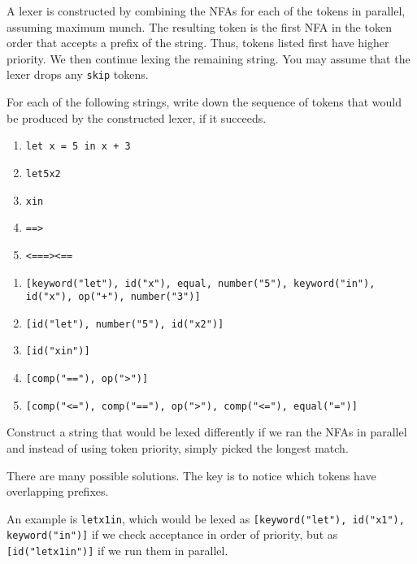 A lexer is constructed by combining the NFAs for each of the tokens in parallel,
assuming maximum munch. The resulting token is the first NFA in the token order
that accepts a prefix of the string. Thus, tokens listed first have higher
priority. We then continue lexing the remaining string. You may assume that the
lexer drops any \texttt{skip} tokens.

\begin{exercise}{}

  For each of the following strings, write down the sequence of tokens that
  would be produced by the constructed lexer, if it succeeds. 

  \begin{enumerate}
    \item \texttt{let x = 5 in x + 3}
    \item \texttt{let5x2}
    \item \texttt{xin}
    \item \texttt{==>}
    \item \texttt{<===><==}
  \end{enumerate}

  \begin{solution}
    \begin{enumerate}
      \item \texttt{[keyword("let"), id("x"), equal, number("5"), keyword("in"), id("x"), op("+"), number("3")]}
      \item \texttt{[id("let"), number("5"), id("x2")]}
      \item \texttt{[id("xin")]}
      \item \texttt{[comp("=="), op(">")]}
      \item \texttt{[comp("<="), comp("=="), op(">"), comp("<="), equal("=")]}
    \end{enumerate}
  \end{solution}
  
\end{exercise}


\begin{exercise}{}
  Construct a string that would be lexed differently if we ran the NFAs in parallel
  and instead of using token priority, simply picked the longest match.

  \begin{solution}
    There are many possible solutions. The key is to notice which tokens have
    overlapping prefixes.

    An example is \texttt{letx1in}, which would be lexed as
    \texttt{[keyword("let"), id("x1"), keyword("in")]} if we check acceptance in
    order of priority, but as \texttt{[id("letx1in")]} if we run them in
    parallel.
  \end{solution}
\end{exercise}
  
  